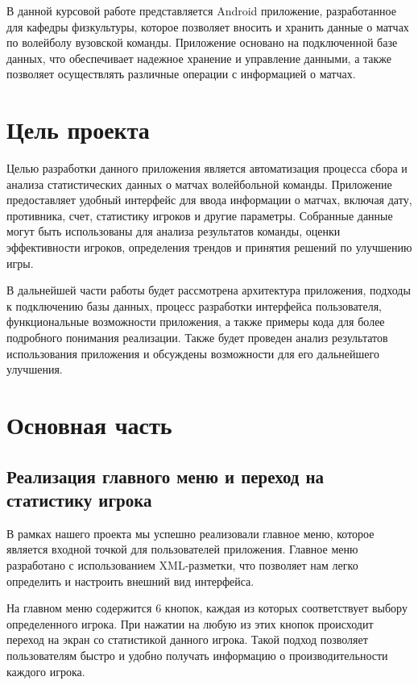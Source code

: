 \documentclass[12pt]{article}
\begin{document}
    В данной курсовой работе представляется Android приложение, разработанное для кафедры физкультуры, которое позволяет вносить и хранить данные о матчах по волейболу вузовской команды. Приложение основано на подключенной базе данных, что обеспечивает надежное хранение и управление данными, а также позволяет осуществлять различные операции с информацией о матчах.

    \section{Цель проекта}
    Целью разработки данного приложения является автоматизация процесса сбора и анализа статистических данных о матчах волейбольной команды. Приложение предоставляет удобный интерфейс для ввода информации о матчах, включая дату, противника, счет, статистику игроков и другие параметры. Собранные данные могут быть использованы для анализа результатов команды, оценки эффективности игроков, определения трендов и принятия решений по улучшению игры.

    В дальнейшей части работы будет рассмотрена архитектура приложения, подходы к подключению базы данных, процесс разработки интерфейса пользователя, функциональные возможности приложения, а также примеры кода для более подробного понимания реализации. Также будет проведен анализ результатов использования приложения и обсуждены возможности для его дальнейшего улучшения.

    \section{Основная часть}
    \subsection{Реализация главного меню и переход на статистику игрока}

    В рамках нашего проекта мы успешно реализовали главное меню, которое является входной точкой для пользователей приложения. Главное меню разработано с использованием XML-разметки, что позволяет нам легко определить и настроить внешний вид интерфейса.

    На главном меню содержится 6 кнопок, каждая из которых соответствует выбору определенного игрока. При нажатии на любую из этих кнопок происходит переход на экран со статистикой данного игрока. Такой подход позволяет пользователям быстро и удобно получать информацию о производительности каждого игрока.
\end{document}
